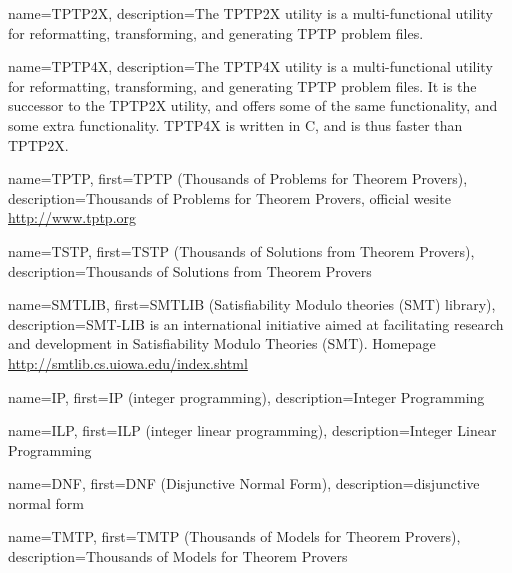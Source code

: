  {
    name=TPTP2X,
    description={The TPTP2X utility is a multi-functional utility for reformatting, transforming, and generating TPTP problem files.}
}

 {
    name=TPTP4X,
    description={The TPTP4X utility is a multi-functional utility for reformatting, transforming, and generating TPTP problem files. It is the successor to the TPTP2X utility, and offers some of the same functionality, and some extra functionality. TPTP4X is written in C, and is thus faster than TPTP2X.}
}

 {
    name=TPTP,
    first={TPTP (Thousands of Problems for Theorem Provers)},
    description={Thousands of Problems for Theorem Provers, official wesite \url{http://www.tptp.org}}
}

 {
    name=TSTP,
    first={TSTP (Thousands of Solutions from Theorem Provers)},
    description={Thousands of Solutions from Theorem Provers}
}

 {
    name=SMTLIB,
    first={SMTLIB (Satisfiability Modulo theories (SMT) library)},
    description={SMT-LIB is an international initiative aimed at facilitating research and development in Satisfiability Modulo Theories (SMT). Homepage \url{http://smtlib.cs.uiowa.edu/index.shtml}}
}

 {
    name=IP,
    first={IP (integer programming)},
    description={Integer Programming}
}

 {
    name=ILP,
    first={ILP (integer linear programming)},
    description={Integer Linear Programming}
}

 {
    name=DNF,
    first={DNF (Disjunctive Normal Form)},
    description={disjunctive normal form}
}

 {
    name=TMTP,
    first={TMTP (Thousands of Models for Theorem Provers)},
    description={Thousands of Models for Theorem Provers}
}
